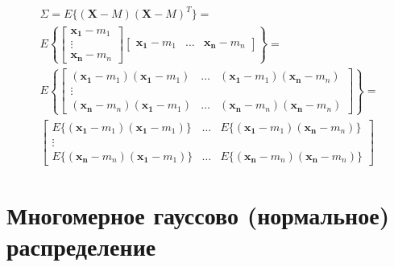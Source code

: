 \documentclass{beamer}
\begin{document}
\begin{frame}
  \frametitle{\insertsection}
  \framesubtitle{\insertsubsection}
  \begin{multline*}
    \Sigma = E\{(\mathbf{X} - M)(\mathbf{X} - M)^T\} =\\
    E \left\{
    \begin{bmatrix}
      \mathbf{x_1} - m_1\\
      \vdots\\
      \mathbf{x_n} - m_n
    \end{bmatrix}
    \begin{bmatrix}
      \mathbf{x_1} - m_1 & \ldots & \mathbf{x_n} - m_n
    \end{bmatrix}
    \right\} =\\
      E \left\{
      \begin{bmatrix}
        (\mathbf{x_1} - m_1)(\mathbf{x_1} - m_1) & \ldots & (\mathbf{x_1} - m_1)(\mathbf{x_n} - m_n)\\
        \vdots & &\\
        (\mathbf{x_n} - m_n)(\mathbf{x_1} - m_1) & \ldots & (\mathbf{x_n} - m_n)(\mathbf{x_n} - m_n) 
      \end{bmatrix}
      \right\} =\\
      \begin{bmatrix}
        E\{(\mathbf{x_1} - m_1)(\mathbf{x_1} - m_1)\} & \ldots & E\{(\mathbf{x_1} - m_1)(\mathbf{x_n} - m_n)\}\\
        \vdots & &\\
        E\{(\mathbf{x_n} - m_n)(\mathbf{x_1} - m_1)\} & \ldots & E\{(\mathbf{x_n} - m_n)(\mathbf{x_n} - m_n)\} 
      \end{bmatrix}
  \end{multline*}

\end{frame}

\section{Многомерное гауссово (нормальное) распределение}
\end{document}
